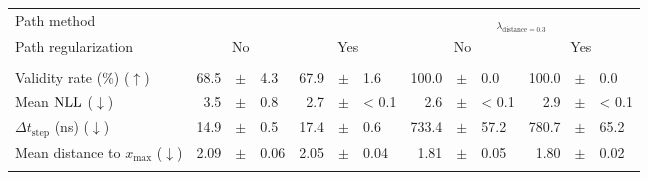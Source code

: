 \documentclass[../main.tex]{subfiles}
\begin{document}
\begin{adjustwidth}{-2.7in}{-3in}
	\begin{center}
		\begin{tabular}{lrllrllrllrll}
			\toprule
			Path method                                    & \multicolumn{6}{c}{\ls{}}                  & \multicolumn{6}{c}{\revise{}$_{\lambda_{\text{distance} = 0.3}}$}                                                                                                                           \\
			Path regularization                            & \multicolumn{3}{c}{No}                     & \multicolumn{3}{c}{Yes}                                           & \multicolumn{3}{c}{No} & \multicolumn{3}{c}{Yes}                                                                        \\
			\midrule
			                                               & \multicolumn{12}{c}{\CakeOnSea}                                                                                                                                                                                                          \\
			\cmidrule(lr){2-13}
			Validity rate (\%) ($\uparrow$)                & 68.5                                       & $\pm$                                                             & 4.3                    & 67.9                    & $\pm$ & 1.6     & 100.0  & $\pm$ & 0.0   & 100.0   & $\pm$ & 0.0     \\
			Mean $\text{NLL}$ ($\downarrow$)                     & 3.5                                        & $\pm$                                                             & 0.8                    & 2.7                     & $\pm$ & < 0.1   & 2.6    & $\pm$ & < 0.1 & 2.9     & $\pm$ & < 0.1   \\
			$\Delta t_\text{step}$ (ns) ($\downarrow$)     & 14.9                                       & $\pm$                                                             & 0.5                    & 17.4                    & $\pm$ & 0.6     & 733.4  & $\pm$ & 57.2  & 780.7   & $\pm$ & 65.2    \\
			Mean distance to $x_\text{max}$ ($\downarrow$) & 2.09                                       & $\pm$                                                             & 0.06                   & 2.05                    & $\pm$ & 0.04    & 1.81   & $\pm$ & 0.05  & 1.80    & $\pm$ & 0.02    \\
			\midrule
			                                               & \multicolumn{12}{c}{\ForestCover}                                                                                                                                                                                                        \\

\end{tabular}
\end{center}
\end{adjustwidth}
\end{document}
